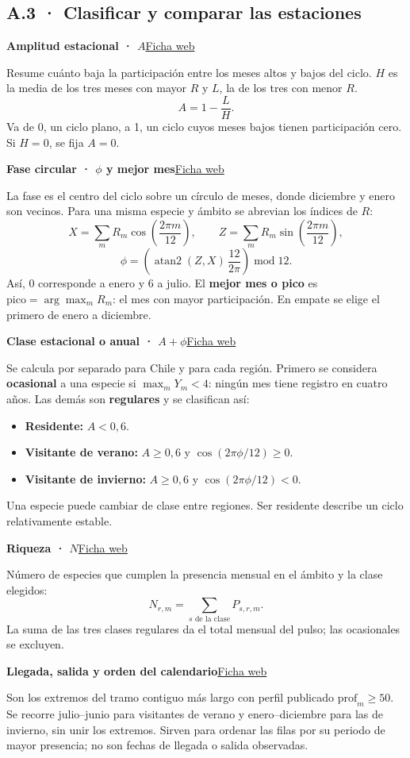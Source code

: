 \documentclass[11pt,a4paper]{article}
\newcommand{\Sitio}{https://canija2000.github.io/infovis_2026-2/}
\newcommand{\defconcepto}[3]{\par\needspace{6\baselineskip}\hypertarget{concepto:#1}{}\textbf{#2}\hfill\href{\Sitio metricas.html\##3}{\textcolor{acento}{\footnotesize Ficha web}}\par\nopagebreak}
\newcommand{\volverconceptos}{\par\medskip{\footnotesize\hyperlink{anexo:conceptos}{\textcolor{acento}{Volver al índice de conceptos}} · \hyperlink{texto:contexto}{\textcolor{acento}{Volver al contexto del proyecto}}}}
\begin{document}
\clearpage
\subsection*{A.3 · Clasificar y comparar las estaciones}

\defconcepto{amplitud}{Amplitud estacional · $A$}{amplitud}
Resume cuánto baja la participación entre los meses altos y bajos del ciclo. $H$ es la media de los tres meses con mayor $R$ y $L$, la de los tres con menor $R$.
\[
A=1-\frac{L}{H}.
\]
Va de 0, un ciclo plano, a 1, un ciclo cuyos meses bajos tienen participación cero. Si $H=0$, se fija $A=0$.

\defconcepto{fase}{Fase circular · $\phi$ y mejor mes}{fase}
La fase es el centro del ciclo sobre un círculo de meses, donde diciembre y enero son vecinos. Para una misma especie y ámbito se abrevian los índices de $R$:
\[
X=\sum_m R_m\cos\!\left(\frac{2\pi m}{12}\right),
\qquad Z=\sum_m R_m\sin\!\left(\frac{2\pi m}{12}\right),
\]
\[
\phi=\left(\operatorname{atan2}(Z,X)\,\frac{12}{2\pi}\right)\operatorname{mod}12.
\]
Así, 0 corresponde a enero y 6 a julio.
\hypertarget{concepto:pico}{}El \textbf{mejor mes o pico} es $\text{pico}=\arg\max_m R_m$: el mes con mayor participación. En empate se elige el primero de enero a diciembre.

\defconcepto{clases}{Clase estacional o anual · $A+\phi$}{clases}
Se calcula por separado para Chile y para cada región. Primero se considera \textbf{ocasional} a una especie si $\max_m Y_m<4$: ningún mes tiene registro en cuatro años. Las demás son \textbf{regulares} y se clasifican así:
\begin{itemize}
\item \textbf{Residente:} $A<0{,}6$.
\item \textbf{Visitante de verano:} $A\geq0{,}6$ y $\cos(2\pi\phi/12)\geq0$.
\item \textbf{Visitante de invierno:} $A\geq0{,}6$ y $\cos(2\pi\phi/12)<0$.
\end{itemize}
Una especie puede cambiar de clase entre regiones. Ser residente describe un ciclo relativamente estable.

\defconcepto{riqueza}{Riqueza · $N$}{riqueza}
Número de especies que cumplen la presencia mensual en el ámbito y la clase elegidos:
\[
N_{r,m}=\sum_{s\text{ de la clase}}P_{s,r,m}.
\]
La suma de las tres clases regulares da el total mensual del pulso; las ocasionales se excluyen.

\defconcepto{llegada}{Llegada, salida y orden del calendario}{llegada}
Son los extremos del tramo contiguo más largo con perfil publicado $\text{prof}_m\geq50$. Se recorre julio--junio para visitantes de verano y enero--diciembre para las de invierno, sin unir los extremos. Sirven para ordenar las filas por su periodo de mayor presencia; no son fechas de llegada o salida observadas.
\volverconceptos
\end{document}
